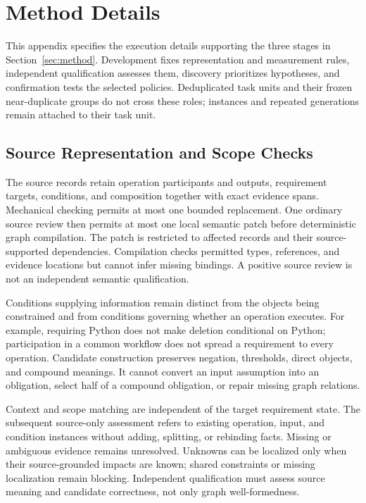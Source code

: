 \section{Method Details}
\label{app:method-details}

This appendix specifies the execution details supporting the three stages in
Section~\ref{sec:method}. Development fixes representation and measurement rules,
independent qualification assesses them, discovery prioritizes hypotheses, and
confirmation tests the selected policies. Deduplicated task units and their
frozen near-duplicate groups do not cross these roles; instances and repeated
generations remain attached to their task unit.

\subsection{Source Representation and Scope Checks}
\label{app:representation-details}

The source records retain operation participants and outputs, requirement
targets, conditions, and composition together with exact evidence spans.
Mechanical checking permits at most one bounded replacement. One ordinary
source review then permits at most one local semantic patch before deterministic
graph compilation. The patch is restricted to affected records and their
source-supported dependencies. Compilation checks permitted types, references,
and evidence locations but cannot infer missing bindings. A positive source
review is not an independent semantic qualification.

Conditions supplying information remain distinct from the objects being
constrained and from conditions governing whether an operation executes.
For example, requiring Python does not make deletion conditional on Python;
participation in a common workflow does not spread a requirement to every
operation. Candidate construction preserves negation, thresholds, direct objects,
and compound meanings. It cannot convert an input assumption into an obligation,
select half of a compound obligation, or repair missing graph relations.

Context and scope matching are independent of the target requirement state.
The subsequent source-only assessment refers to existing operation, input, and
condition instances without adding, splitting, or rebinding facts. Missing or
ambiguous evidence remains unresolved. Unknowns can be localized only when their
source-grounded impacts are known; shared constraints or missing localization
remain blocking. Independent qualification must assess source meaning and
candidate correctness, not only graph well-formedness.

